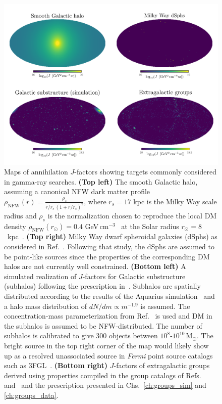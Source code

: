 \begin{figure}[htbp] 
\centering
 \includegraphics[width=1.0\textwidth]{ch-intro/jfactors.pdf}
\caption{Maps of annihilation $J$-factors showing targets commonly considered in gamma-ray searches. \textbf{(Top left)} The smooth Galactic halo, assuming a canonical NFW dark matter profile $\rho_\text{NFW}(r)=\frac{\rho_{s}}{r/r_{s}\,(1+r/r_{s})^{2}}$, where $r_s=17$ kpc is the Milky Way scale radius and $\rho_s$ is the normalization chosen to reproduce the local DM density $\rho_\text{NFW}(r_\odot) = 0.4$ GeV$\,$cm$^{-3}$~\cite{2015ApJ...814...13M,Sivertsson:2017rkp} at the Solar radius $r_\odot = 8$~kpc~\cite{Read:2014qva}. \textbf{(Top right)} Milky Way dwarf spheroidal galaxies (dSphs) as considered in Ref.~\cite{Fermi-LAT:2016uux}. Following that study, the dSphs are assumed to be point-like sources since the properties of the corresponding DM halos are not currently well constrained. \textbf{(Bottom left)} A simulated realization of $J$-factors for Galactic substructure (subhalos) following the prescription in~\cite{Hutten:2016jko}. Subhalos are spatially distributed according to the results of the Aquarius simulation~\cite{Springel:2008cc} and a halo mass distribution of $dN/dm\propto m^{-1.9}$ is assumed. The concentration-mass parameterization from Ref.~\cite{Sanchez-Conde:2013yxa} is used and DM in the subhalos is assumed to be NFW-distributed. The number of subhalos is calibrated to give 300 objects between $10^8$-$10^{10}$\,M$_\odot$. The bright source in the top right corner of the map would likely show up as a resolved unassociated source in \emph{Fermi} point source catalogs such as 3FGL~\cite{Bertoni:2015mla}. \textbf{(Bottom right)} $J$-factors of extragalactic groups derived using properties compiled in the group catalogs of Refs.~\cite{Tully:2015opa} and~\cite{2017ApJ...843...16K} and the prescription presented in Chs.~\ref{ch:groups_sim} and \ref{ch:groups_data}.}  
\label{fig:sources}
\end{figure}


